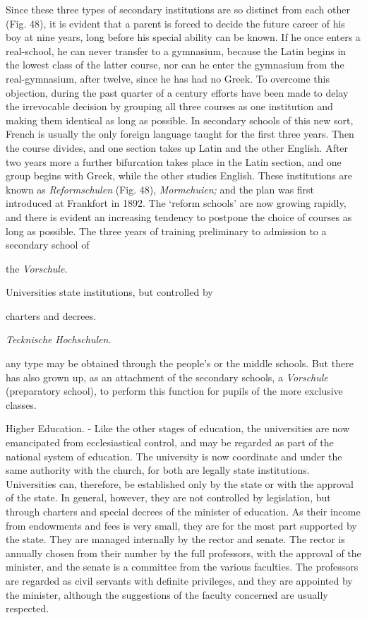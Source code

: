 \documentclass[
]{book}
\begin{document}
Since these three types of secondary institutions are so distinct from each other (Fig. 48), it is evident that a parent is forced to decide the future career of his boy at nine years, long before his special ability can be known. If he once enters a real-school, he can never transfer to a gymnasium, because the Latin begins in the lowest class of the latter course, nor can he enter the gymnasium from the real-gymnasium, after twelve, since he has had no Greek. To overcome this objection, during the past quarter of a century efforts have been made to delay the irrevocable decision by grouping all three courses as one institution and making them identical as long as possible. In secondary schools of this new sort, French is usually the only foreign language taught for the first three years. Then the course divides, and one section takes up Latin and the other English. After two years more a further bifurcation takes place in the Latin section, and one group begins with Greek, while the other studies English. These institutions are known as \emph{Reformschulen} (Fig. 48), \emph{Mormchuien;} and the plan was first introduced at Frankfort in 1892. The `reform schools' are now growing rapidly, and there is evident an increasing tendency to postpone the choice of courses as long as possible. The three years of training preliminary to admission to a secondary school of

the \emph{Vorschule.}

Universities state institutions, but controlled by

charters and decrees.

\emph{Tecknische} \emph{Hochschulen.}

any type may be obtained through the people's or the middle schools. But there has also grown up, as an attachment of the secondary schools, a \emph{Vorschule} (preparatory school), to perform this function for pupils of the more exclusive classes.

Higher Education. - Like the other stages of education, the universities are now emancipated from ecclesiastical control, and may be regarded as part of the national system of education. The university is now coordinate and under the same authority with the church, for both are legally state institutions. Universities can, therefore, be established only by the state or with the approval of the state. In general, however, they are not controlled by legislation, but through charters and special decrees of the minister of education. As their income from endowments and fees is very small, they are for the most part supported by the state. They are managed internally by the rector and senate. The rector is annually chosen from their number by the full professors, with the approval of the minister, and the senate is a committee from the various faculties. The professors are regarded as civil servants with definite privileges, and they are appointed by the minister, although the suggestions of the faculty concerned are usually respected.
\end{document}
